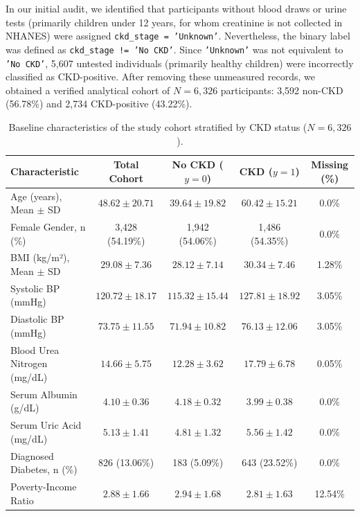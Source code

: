 \documentclass[runningheads]{llncs}
\begin{document}
In our initial audit, we identified that participants without blood draws or urine tests (primarily children under 12 years, for whom creatinine is not collected in NHANES) were assigned \texttt{ckd\_stage = 'Unknown'}. Nevertheless, the binary label was defined as \texttt{ckd\_stage != 'No CKD'}. Since \texttt{'Unknown'} was not equivalent to \texttt{'No CKD'}, 5,607 untested individuals (primarily healthy children) were incorrectly classified as CKD-positive. After removing these unmeasured records, we obtained a verified analytical cohort of $N = 6,326$ participants: 3,592 non-CKD (56.78\%) and 2,734 CKD-positive (43.22\%).

\begin{table}[t]
\caption{Baseline characteristics of the study cohort stratified by CKD status ($N = 6,326$).}\label{tab:baseline}
\centering
\small
\begin{tabular}{lcccc}
\toprule
Characteristic & Total Cohort & No CKD ($y=0$) & CKD ($y=1$) & Missing (\%) \\
\midrule
Age (years), Mean $\pm$ SD & $48.62 \pm 20.71$ & $39.64 \pm 19.82$ & $60.42 \pm 15.21$ & 0.0\% \\
Female Gender, n (\%) & 3,428 (54.19\%) & 1,942 (54.06\%) & 1,486 (54.35\%) & 0.0\% \\
BMI (kg/m²), Mean $\pm$ SD & $29.08 \pm 7.36$ & $28.12 \pm 7.14$ & $30.34 \pm 7.46$ & 1.28\% \\
Systolic BP (mmHg) & $120.72 \pm 18.17$ & $115.32 \pm 15.44$ & $127.81 \pm 18.92$ & 3.05\% \\
Diastolic BP (mmHg) & $73.75 \pm 11.55$ & $71.94 \pm 10.82$ & $76.13 \pm 12.06$ & 3.05\% \\
Blood Urea Nitrogen (mg/dL) & $14.66 \pm 5.75$ & $12.28 \pm 3.62$ & $17.79 \pm 6.78$ & 0.05\% \\
Serum Albumin (g/dL) & $4.10 \pm 0.36$ & $4.18 \pm 0.32$ & $3.99 \pm 0.38$ & 0.0\% \\
Serum Uric Acid (mg/dL) & $5.13 \pm 1.41$ & $4.81 \pm 1.32$ & $5.56 \pm 1.42$ & 0.0\% \\
Diagnosed Diabetes, n (\%) & 826 (13.06\%) & 183 (5.09\%) & 643 (23.52\%) & 0.0\% \\
Poverty-Income Ratio & $2.88 \pm 1.66$ & $2.94 \pm 1.68$ & $2.81 \pm 1.63$ & 12.54\% \\
\bottomrule
\end{tabular}
\end{table}
\end{document}
